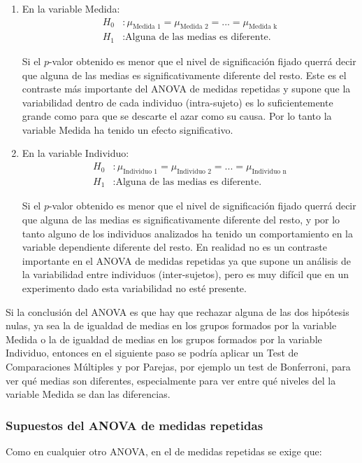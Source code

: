 \begin{enumerate}
\item En la variable Medida:
\begin{align*}
H_0&: \mu_{\text{Medida 1}}=\mu_{\text{Medida 2}}=...=\mu_{\text{Medida k}}\\
H_1&: \text{Alguna de las medias es diferente.}
\end{align*}

Si el $p$-valor obtenido es menor que el nivel de significación fijado querrá decir que alguna de las medias es significativamente diferente del resto. Este es el contraste más importante del ANOVA de medidas repetidas y supone que la variabilidad dentro de cada individuo (intra-sujeto) es lo suficientemente grande como para que se descarte el azar como su causa. Por lo tanto la variable Medida ha tenido un efecto significativo.

\item En la variable Individuo:
\begin{align*}
H_0&: \mu_{\text{Individuo 1}}=\mu_{\text{Individuo 2}}=...=\mu_{\text{Individuo n}}\\
H_1&: \text{Alguna de las medias es diferente.}
\end{align*}

Si el $p$-valor obtenido es menor que el nivel de significación fijado querrá decir que alguna de las medias es significativamente diferente del resto, y por lo tanto alguno de los individuos analizados ha tenido un comportamiento en la variable dependiente diferente del resto. En realidad no es un contraste importante en el ANOVA de medidas repetidas ya que supone un análisis de la variabilidad entre individuos (inter-sujetos), pero es muy difícil que en un experimento dado esta variabilidad no esté presente.
\end{enumerate}

Si la conclusión del ANOVA es que hay que rechazar alguna de las dos hipótesis nulas, ya sea la de igualdad de medias en
los grupos formados por la variable Medida o la de igualdad de medias en los grupos formados por la variable Individuo,
entonces en el siguiente paso se podría aplicar un Test de Comparaciones Múltiples y por Parejas, por ejemplo un test de
Bonferroni, para ver qué medias son diferentes, especialmente para ver entre qué niveles del la variable Medida se dan
las diferencias.


\subsubsection{Supuestos del ANOVA de medidas repetidas}
Como en cualquier otro ANOVA, en el de medidas repetidas se exige que:

